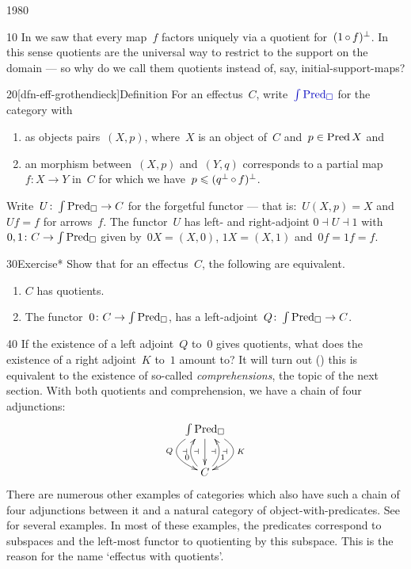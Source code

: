 \begin{parsec}{1980}%
\begin{point}{10}%
In  we saw
    that every  map~$f$
    factors uniquely via a quotient for~$(1 \mathop{\circ} f)^\perp$.
In this sense quotients are the universal way to restrict to the
    support on the domain --- so why do we call them quotients
    instead of, say, initial-support-maps?
\end{point}
\begin{point}{20}[dfn-eff-grothendieck]{Definition}%
For an effectus~$C$,
    write~$\Define{\int \Pred_\square}$
    \index{$\int \Pred_\square$}
    for the category with
\begin{enumerate}
\item as objects pairs~$(X,p)$,
        where~$X$ is an object of~$C$
        and~$p \in \operatorname{Pred} X$ and
\item
    an morphism between~$(X,p)$ and~$(Y,q)$
    corresponds to a partial map~$f\colon X \to Y$ in~$C$
       for which we have~$p \leqslant (q^\perp \mathop{\circ} f)^\perp$.
\end{enumerate}
Write~$U\colon \int \operatorname{Pred}_\square \to C$
for the forgetful functor --- that is:~$U(X,p) = X$
and~$Uf = f$ for arrows~$f$.
The functor~$U$ has left- and right-adjoint
    $0 \dashv U \dashv 1$
    with
    $0,1 \colon C \to \int \operatorname{Pred}_\square$
    given by~$0X = (X,0)$, $1X = (X,1)$
    and~$0f=1f=f$.
\end{point}
\begin{point}{30}{Exercise*}%
Show that for an effectus~$C$, the following are equivalent.
\begin{enumerate}
\item $C$ has quotients.
\item The functor~$0\colon C \to \int \operatorname{Pred}_\square$,
        has a left-adjoint~$Q \colon \int\operatorname{Pred}_\square \to C$.
\end{enumerate}
\end{point}
\begin{point}{40}%
If the existence of a left adjoint~$Q$ to~$0$
    gives quotients,
    what does the existence of a right adjoint~$K$ to~$1$ amount to?
    It will turn out ()
    this is equivalent to the existence of
        so-called \emph{comprehensions},
        the topic of the next section.
With both quotients and comprehension, we have a chain of four adjunctions:
\begin{equation*}
   \vcenter{\xymatrix{
\int \Pred_\square \ar[d]_{\dashv\;}^{\;\dashv}
   \ar@/_6ex/[d]^{\;\dashv}_{Q} 
   \ar@/^6ex/[d]_{\dashv\;}^{K} \\
   C\ar@/^3ex/[u]^(0.4){0\!}\ar@/_3ex/[u]_(0.4){\!1}
}} 
\end{equation*}
There are numerous other examples
    of categories which also
    have such a chain of four adjunctions
    between it and a natural category of object-with-predicates.
    See \cite{cho2015quotient} for several examples.
    In most of these examples, the predicates correspond to subspaces
        and the left-most functor to quotienting by this subspace.
    This is the reason for the name `effectus with quotients'.
\end{point}
\end{parsec}

